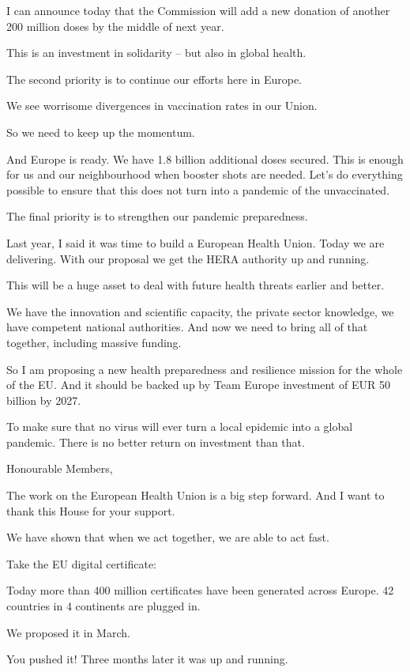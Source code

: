 \documentclass[a4paper,11pt]{article}
\begin{document}
I can announce today that the Commission will add a new donation of another 200 million doses by the middle of next year.

This is an investment in solidarity – but also in global health.

The second priority is to continue our efforts here in Europe.

We see worrisome divergences in vaccination rates in our Union.

So we need to keep up the momentum.

And Europe is ready. We have 1.8 billion additional doses secured. This is enough for us and our neighbourhood when booster shots are needed. Let's do everything possible to ensure that this does not turn into a pandemic of the unvaccinated.

The final priority is to strengthen our pandemic preparedness.

Last year, I said it was time to build a European Health Union. Today we are delivering. With our proposal we get the HERA authority up and running.

This will be a huge asset to deal with future health threats earlier and better.

We have the innovation and scientific capacity, the private sector knowledge, we have competent national authorities. And now we need to bring all of that together, including massive funding. 

So I am proposing a new health preparedness and resilience mission for the whole of the EU. And it should be backed up by Team Europe investment of EUR 50 billion by 2027. 

To make sure that no virus will ever turn a local epidemic into a global pandemic. There is no better return on investment than that. 

 

Honourable Members,

The work on the European Health Union is a big step forward. And I want to thank this House for your support.

We have shown that when we act together, we are able to act fast.

Take the EU digital certificate:

Today more than 400 million certificates have been generated across Europe. 42 countries in 4 continents are plugged in.

We proposed it in March.

You pushed it!
Three months later it was up and running.
\end{document}
